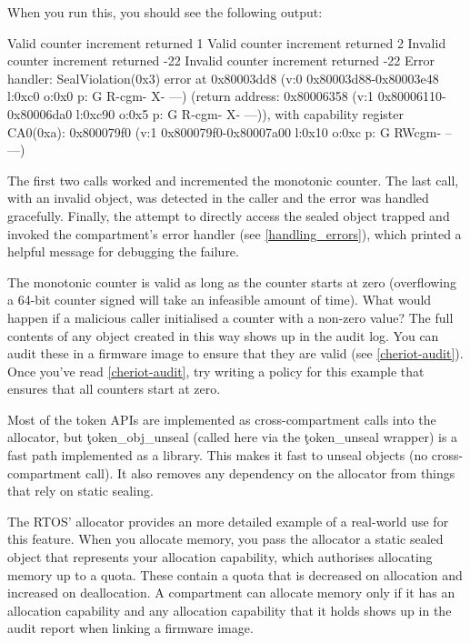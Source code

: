 When you run this, you should see the following output:

\begin{console}
Valid counter increment returned 1
Valid counter increment returned 2
Invalid counter increment returned -22
Invalid counter increment returned -22
Error handler: SealViolation(0x3) error at 0x80003dd8 (v:0 0x80003d88-0x80003e48 l:0xc0 o:0x0 p: G R-cgm- X- ---) (return address: 0x80006358 (v:1 0x80006110-0x80006da0 l:0xc90 o:0x5 p: G R-cgm- X- ---)), with capability register CA0(0xa): 0x800079f0 (v:1 0x800079f0-0x80007a00 l:0x10 o:0xc p: G RWcgm- -- ---)
\end{console}

The first two calls worked and incremented the monotonic counter.
The last call, with an invalid object, was detected in the caller and the error was handled gracefully.
Finally, the attempt to directly access the sealed object trapped and invoked the compartment's error handler (see \ref{handling_errors}), which printed a helpful message for debugging the failure.

The monotonic counter is valid as long as the counter starts at zero (overflowing a 64-bit counter signed will take an infeasible amount of time).
What would happen if a malicious caller initialised a counter with a non-zero value?
The full contents of any object created in this way shows up in the audit log.
You can audit these in a firmware image to ensure that they are valid (see \ref{cheriot-audit}).
Once you've read \ref{cheriot-audit}, try writing a policy for this example that ensures that all counters start at zero.

Most of the token APIs are implemented as cross-compartment calls into the allocator, but \c{token_obj_unseal} (called here via the \c{token_unseal} wrapper) is a fast path implemented as a library.
This makes it fast to unseal objects (no cross-compartment call).
It also removes any dependency on the allocator from things that rely on static sealing.

The RTOS' allocator provides an more detailed example of a real-world use for this feature.
When you allocate memory, you pass the allocator a static sealed object that represents your allocation capability, which authorises allocating memory up to a quota.
These contain a quota that is decreased on allocation and increased on deallocation.
A compartment can allocate memory only if it has an allocation capability and any allocation capability that it holds shows up in the audit report when linking a firmware image.

